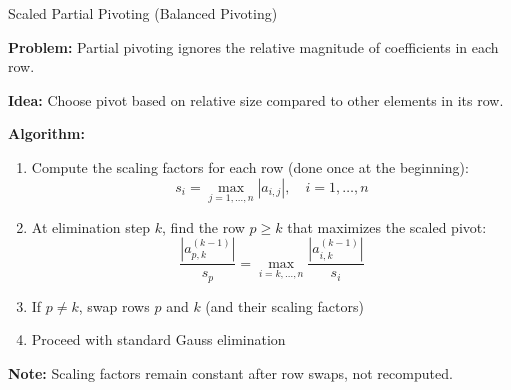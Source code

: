 \documentclass[aspectratio=169]{beamer}
\begin{document}
\begin{frame}{Scaled Partial Pivoting (Balanced Pivoting)}
	\small{\textbf{Problem:} Partial pivoting ignores the relative magnitude of coefficients in each row.

		\textbf{Idea:} Choose pivot based on \alert{relative size} compared to other elements in its row.

		\vspace{-0.15cm}
		\alert{\textbf{Algorithm:}}
		\begin{enumerate}
			\item Compute the \alert{scaling factors} for each row (done once at the beginning):
			      \begin{equation*}
				      s_i = \max_{j=1,\ldots,n} |a_{i,j}|, \quad i = 1, \ldots, n
			      \end{equation*}

			\item At elimination step $k$, find the row $p \geq k$ that maximizes the \alert{scaled pivot}:
			      \begin{equation*}
				      \frac{|a_{p,k}^{(k-1)}|}{s_p} = \max_{i=k,\ldots,n} \frac{|a_{i,k}^{(k-1)}|}{s_i}
			      \end{equation*}

			\item If $p \neq k$, swap rows $p$ and $k$ (and their scaling factors)

			\item Proceed with standard Gauss elimination
		\end{enumerate}

		\vspace{-0.3cm}
		\textbf{Note:} Scaling factors remain constant after row swaps, not recomputed.}
\end{frame}
\end{document}
